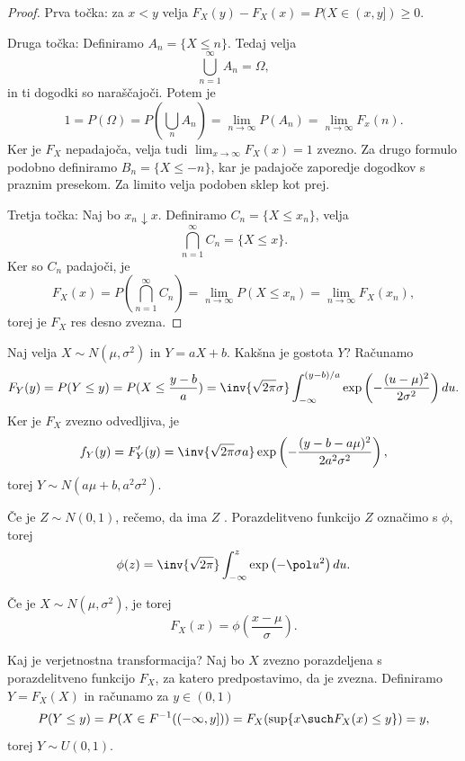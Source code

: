 \begin{proof}
  Prva točka:
  za $x < y$ velja $F_X(y) - F_X(x) = P(X \in (x, y]) \ge 0$.

  Druga točka:
  Definiramo $A_n = \{X \le n\}$.
  Tedaj velja
  \[
	\bigcup_{n=1}^\infty A_n = \Omega,
  \]
  in ti dogodki so naraščajoči.
  Potem je
  \[
	1 = P(\Omega) = P\left( \bigcup_n A_n \right) = \lim_{n \to \infty} P(A_n)
	= \lim_{n \to \infty} F_x(n).
  \]
  Ker je $F_X$ nepadajoča, velja tudi $\lim_{x \to \infty} F_X(x) = 1$ zvezno.
  Za drugo formulo podobno definiramo $B_n = \{X \le -n\}$, kar je padajoče
  zaporedje dogodkov s praznim presekom.
  Za limito velja podoben sklep kot prej.

  Tretja točka:
  Naj bo $x_n \downarrow x$.
  Definiramo $C_n = \{X \le x_n\}$, velja
  \[
	\bigcap_{n=1}^{\infty} C_n = \{X \le x\}.
  \]
  Ker so $C_n$ padajoči, je
  \[
	F_X(x) = P\left( \bigcap_{n=1}^\infty C_n \right) = \lim_{n \to \infty} P(X
	\le x_n) = \lim_{n \to \infty} F_X(x_n),
  \]
  torej je $F_X$ res desno zvezna.
\end{proof}


\begin{vo}{Naj velja $X \sim N(\mu, \sigma^2)$ in $Y = aX+b$. Kakšna je gostota
	$Y$?}
  Računamo
  \[
	F_Y(y) = P(Y \le y)
	= P(X \le \frac{y-b}{a})
	= \inv{\sqrt{2\pi} \sigma} \int_{-\infty}^{(y-b)/a} \exp\left( - \frac{(u -
		\mu)^2}{2 \sigma^2} \right) du.
  \]
  Ker je $F_X$ zvezno odvedljiva, je
  \[
	f_Y(y) = F_Y'(y) = \inv{\sqrt{2 \pi} \sigma a} \exp\left( - \frac{(y-b-a
		\mu)^2}{2 a^2 \sigma^2} \right),
  \]
  torej $Y \sim N(a \mu + b, a^2 \sigma^2)$.
\end{vo}

\begin{definicija}
  Če je $Z \sim N(0, 1)$, rečemo, da ima $Z$ .
  Porazdelitveno funkcijo $Z$ označimo s $\phi$, torej
  \[
	\phi(z) = \inv{\sqrt{2 \pi}} \int_{-\infty}^z \exp\left( -\pol u^2 \right) du.
  \]
\end{definicija}

Če je $X \sim N(\mu, \sigma^2)$, je torej
\[
  F_X(x) = \phi\left(\frac{x-\mu}{\sigma}\right).
\]


\begin{vo}{Kaj je verjetnostna transformacija?}
  Naj bo $X$ zvezno porazdeljena s porazdelitveno funkcijo $F_X$, za katero
  predpostavimo, da je zvezna.
  Definiramo $Y = F_X(X)$ in računamo za $y \in (0,1)$
  \[
	P(Y \le y)
	= P(X \in F^{-1}((-\infty, y]))
	= F_X(\sup\{x \such F_X(x) \le y\})
	= y,
  \]
  torej $Y \sim U(0,1)$.
\end{vo}

